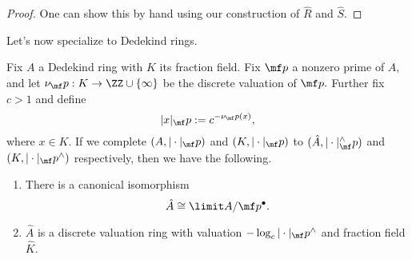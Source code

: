 \documentclass[../notes.tex]{subfiles}
\begin{document}
\begin{proof}
	One can show this by hand using our construction of $\hat R$ and $\hat S.$
\end{proof}
Let's now specialize to Dedekind rings.
\begin{proposition}
	Fix $A$ a Dedekind ring with $K$ its fraction field. Fix $\mf p$ a nonzero prime of $A,$ and let $\nu_\mf p:K\to\ZZ\cup\{\infty\}$ be the discrete valuation of $\mf p.$ Further fix $c>1$ and define
	\[|x|_\mf p:=c^{-\nu_\mf p(x)},\]
	where $x\in K.$ If we complete $(A,|\cdot|_\mf p)$ and $(K,|\cdot|_\mf p)$ to $(\hat A,|\cdot|^\wedge_\mf p)$ and $(K,|\cdot|_\mf p^\wedge)$ respectively, then we have the following.
	\begin{enumerate}[label=(\alph*)]
		\item There is a canonical isomorphism
		\[\hat A\cong\limit A/\mf p^\bullet.\]
		\item $\hat A$ is a discrete valuation ring with valuation $-\log_c|\cdot|_\mf p^\wedge$ and fraction field $\hat K.$
	\end{enumerate}
\end{proposition}
\end{document}
